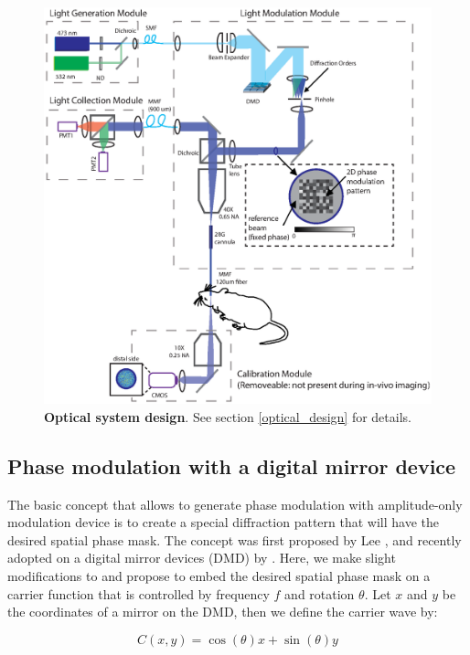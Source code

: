 \documentclass[10pt]{article}
\begin{document}
\begin{figure}[ht!]
\centering\includegraphics[width=15cm]{figure2}
\caption{\textbf{Optical system design}. See section \ref{optical_design} for details.}
\label{fig:figure2}
\end{figure}



\subsection{Phase modulation with a digital mirror device}
The basic concept that allows to generate phase modulation with amplitude-only modulation device is to create a special diffraction pattern that will have the desired spatial phase mask. The concept was first proposed by Lee \cite{Lee1978-ga}, and recently adopted on a digital mirror devices (DMD) by \cite{Conkey2012-qe}. Here, we make slight modifications to \cite{Conkey2012-qe} and propose to embed the desired spatial phase mask on a carrier function that is controlled by frequency $f$ and rotation $\theta$. Let $x$ and $y$ be the coordinates of a mirror on the DMD, then we define the carrier wave by:

\[C\left( {x,y} \right) = \cos \left( \theta  \right)x + \sin \left( \theta  \right)y\]
\end{document}
